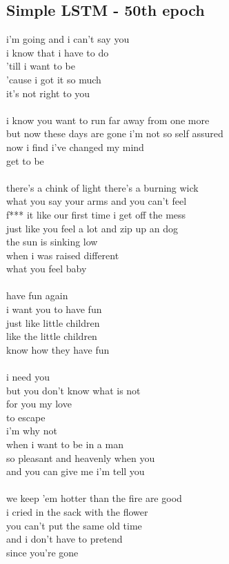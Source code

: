 \documentclass[conference]{IEEEtran}
\begin{document}
\subsection{Simple LSTM - 50th epoch}\label{LSTM50}
i'm going and i can't say you \\
i know that i have to do \\
'till i want to be \\
'cause i got it so much \\
it's not right to you \\
 \\
i know you want to run far away from one more \\
but now these days are gone i'm not so self assured \\
now i find i've changed my mind \\
get to be \\
 \\
there's a chink of light there's a burning wick \\
what you say your arms and you can't feel \\
f*** it like our first time i get off the mess \\
just like you feel a lot and zip up an dog \\
the sun is sinking low \\
when i was raised different \\
what you feel baby \\
 \\
have fun again \\
i want you to have fun \\
just like little children \\
like the little children \\
know how they have fun \\
 \\
i need you \\
but you don't know what is not \\
for you my love \\
to escape \\
i'm why not \\
when i want to be in a man \\
so pleasant and heavenly when you \\
and you can give me i'm tell you \\
 \\
we keep 'em hotter than the fire are good \\
i cried in the sack with the flower \\
you can't put the same old time \\
and i don't have to pretend \\
since you're gone \\
\end{document}

